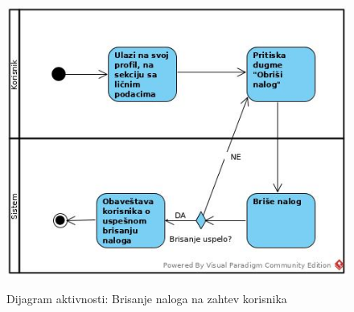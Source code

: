 \documentclass[20pt]{article}
\begin{document}
\begin{figure}[h]
		\centering
		\includegraphics[width=1.1\textwidth,height=0.57\textheight]{Pictures/BrisanjeNalogaNaZahtevKorisnika.jpg}\\
		\caption{Dijagram aktivnosti: Brisanje naloga na zahtev korisnika}
		\label{fig:dijagramAktivnostiBrisanjeKorisnik}
	\end{figure}
	

\newpage
\end{document}

